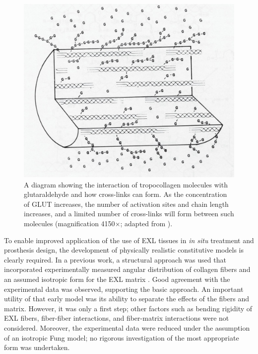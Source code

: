    
\begin{figure}
\centering
\includegraphics[width=\textwidth]{Images/chapter3/F2large.jpg}
\caption{A diagram showing the interaction of tropocollagen molecules with glutaraldehyde and how cross-links can form. As the concentration of GLUT increases, the number of activation sites and chain length increases, and a limited number of cross-links will form between such molecules (magnification 4150$\times$; adapted from \cite{nimni_collagen_2018}).}
\label{c3:fig:2}
\end{figure}

    
    To enable improved application of the use of EXL tissues in \textit{in situ} treatment and prosthesis design, the development of physically realistic constitutive models is clearly required. In a previous work, a structural approach was used that incorporated experimentally measured angular distribution of collagen fibers and an assumed isotropic form for the EXL matrix \cite{sacks_structural_2000}. Good agreement with the experimental data was observed, supporting the basic approach. An important utility of that early model was its ability to separate the effects of the fibers and matrix. However, it was only a first step; other factors such as bending rigidity of EXL fibers, fiber-fiber interactions, and fiber-matrix interactions were not considered. Moreover, the experimental data were reduced under the assumption of an isotropic Fung model; no rigorous investigation of the most appropriate form was undertaken.
    
